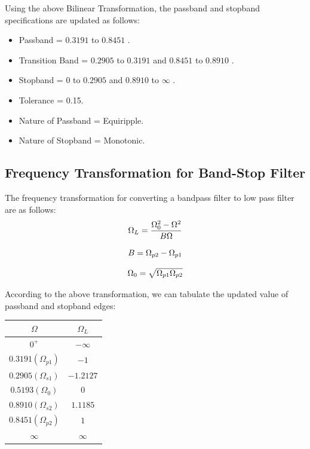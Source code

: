 \documentclass{article}
\begin{document}
Using the above Bilinear Transformation, the passband and stopband specifications are updated as follows:\\

\begin{itemize}
    \item Passband = $0.3191$ to $0.8451$ .
    \item Transition Band = $0.2905$ to $0.3191$ and $0.8451$ to $0.8910$ .
    \item Stopband = $0$ to $0.2905$  and $0.8910$ to $\infty$ .
    \item Tolerance = 0.15.
    \item Nature of Passband = Equiripple.
    \item Nature of Stopband = Monotonic.
\end{itemize}

\subsection{Frequency Transformation for Band-Stop Filter}
The frequency transformation for converting a bandpass filter to low pass filter are as follows:\\

\begin{equation}
    \Omega _{L} = \frac{\Omega _{0}^{2} - \Omega^{2}}{B\Omega}  \\
\end{equation}

\begin{equation}
    B = \Omega _{p2} - \Omega _{p1} \\
\end{equation}

\begin{equation}
    \Omega _{0} = \sqrt{\Omega _{p1}\Omega _{p2}}\\
\end{equation}

According to the above transformation, we can tabulate the updated value of passband and stopband edges:\\

\begin{table}[h]
    \centering
    \begin{tabular}{|c|c|}
        \hline
       $\Omega$ & $\Omega _{L}$\\
       \hline
       $0^+$  & $-\infty$   \\
       \hline
       $0.3191 (\Omega_{p1})$  & $-1$   \\
       \hline
        $0.2905 (\Omega_{s1})$  & $-1.2127$   \\
       \hline
       $0.5193 (\Omega_{0})$  & $0$   \\
       \hline
       $0.8910 (\Omega_{s2})$  & $1.1185$   \\
       \hline
       $0.8451 (\Omega_{p2})$  & $1$   \\
       \hline
       $\infty$  & $\infty$   \\
       \hline
    \end{tabular}
\end{table}
\end{document}
